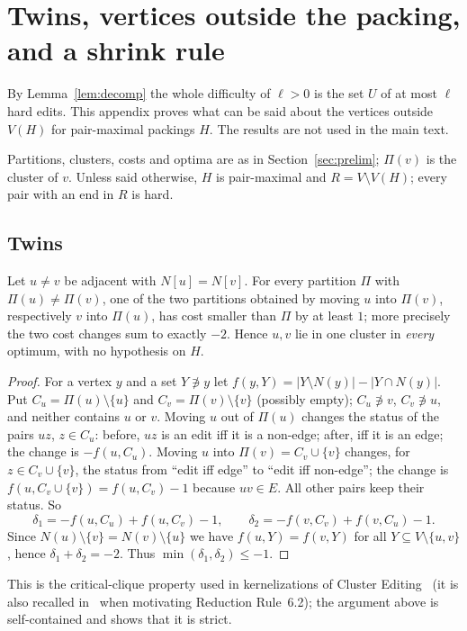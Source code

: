 \section{Twins, vertices outside the packing, and a shrink rule}\label{app:structure}\label{sec:structure}
By Lemma~\ref{lem:decomp} the whole difficulty of $\ell>0$ is the set $U$ of at most $\ell$ hard edits. This appendix proves what can be said about the vertices outside $V(H)$ for pair-maximal packings $H$. The results are not used in the main text.

 Partitions, clusters, costs and optima are as in Section~\ref{sec:prelim}; $\Pi(v)$ is the cluster of $v$. Unless said otherwise, $H$ is pair-maximal and $R=V\setminus V(H)$; every pair with an end in $R$ is hard.

\subsection{Twins}
\begin{lemma}\label{lem:twin}
Let $u\ne v$ be adjacent with $N[u]=N[v]$. For every partition $\Pi$ with $\Pi(u)\ne\Pi(v)$, one of the two partitions obtained by moving $u$ into $\Pi(v)$, respectively $v$ into $\Pi(u)$, has cost smaller than $\Pi$ by at least $1$; more precisely the two cost changes sum to exactly $-2$. Hence $u,v$ lie in one cluster in \emph{every} optimum, with no hypothesis on $H$.
\end{lemma}
\begin{proof}
For a vertex $y$ and a set $Y\not\ni y$ let $f(y,Y)=|Y\setminus N(y)|-|Y\cap N(y)|$. Put $C_u=\Pi(u)\setminus\{u\}$ and $C_v=\Pi(v)\setminus\{v\}$ (possibly empty); $C_u\not\ni v$, $C_v\not\ni u$, and neither contains $u$ or $v$. Moving $u$ out of $\Pi(u)$ changes the status of the pairs $uz$, $z\in C_u$: before, $uz$ is an edit iff it is a non-edge; after, iff it is an edge; the change is $-f(u,C_u)$. Moving $u$ into $\Pi(v)=C_v\cup\{v\}$ changes, for $z\in C_v\cup\{v\}$, the status from ``edit iff edge'' to ``edit iff non-edge''; the change is $f(u,C_v\cup\{v\})=f(u,C_v)-1$ because $uv\in E$. All other pairs keep their status. So
\[\delta_1=-f(u,C_u)+f(u,C_v)-1,\qquad \delta_2=-f(v,C_v)+f(v,C_u)-1 .\]
Since $N(u)\setminus\{v\}=N(v)\setminus\{u\}$ we have $f(u,Y)=f(v,Y)$ for all $Y\subseteq V\setminus\{u,v\}$, hence $\delta_1+\delta_2=-2$. Thus $\min(\delta_1,\delta_2)\le-1$.
\end{proof}
This is the critical-clique property used in kernelizations of Cluster Editing~\cite{FLRS07,Guo09} (it is also recalled in~\cite{BFK18} when motivating Reduction Rule~6.2); the argument above is self-contained and shows that it is strict.

